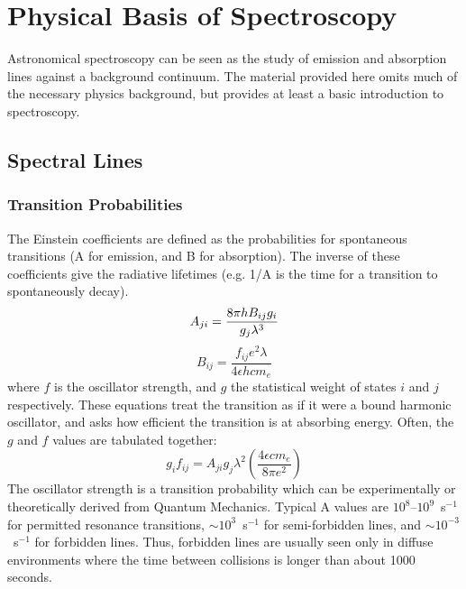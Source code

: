 \chapter{Physical Basis of Spectroscopy}
\label{ch:theory}

Astronomical spectroscopy can be seen as the study of emission and absorption lines against a background continuum. The material provided here omits much of the necessary physics background, but provides at least a basic introduction to spectroscopy.

\section{Spectral Lines}

\subsection{Transition Probabilities}

The Einstein coefficients are defined as the probabilities for spontaneous transitions (A for emission, and B for absorption). The inverse of these coefficients give the radiative lifetimes (e.g. 1/A is the time for a transition to spontaneously decay).
\begin{equation}
	A_{ji} = \frac{8 \pi h B_{ij} g_i}{g_j \lambda^3} \\
\end{equation}
\begin{equation}
	B_{ij} = \frac{f_{ij} e^2 \lambda}{4 \epsilon h c m_e}
\end{equation}
where $f$ is the oscillator strength, and $g$ the statistical weight of states $i$ and $j$ respectively. These equations treat the transition as if it were a bound harmonic oscillator, and asks how efficient the transition is at absorbing energy. Often, the $g$ and $f$ values are tabulated together:
\begin{equation}
	g_i f_{ij} = A_{ji} g_j \lambda^2 \left(\frac{4 \epsilon c m_e}{8 \pi e^2}\right)
\end{equation}
The oscillator strength is a transition probability which can be experimentally or theoretically derived from Quantum Mechanics. Typical A values are $10^8$--$10^9$~s$^{-1}$ for permitted resonance transitions, $\sim 10^3$~s$^{-1}$ for semi-forbidden lines, and $\sim 10^{-3}$~s$^{-1}$ for forbidden lines. Thus, forbidden lines are usually seen only in diffuse environments where the time between collisions is longer than about 1000 seconds.

